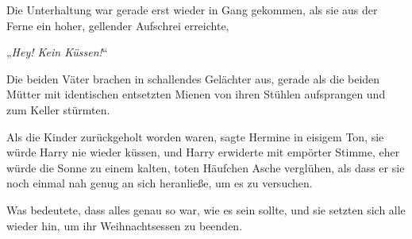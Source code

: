\later

Die Unterhaltung war gerade erst wieder in Gang gekommen, als sie aus der Ferne ein hoher, gellender Aufschrei erreichte,

„\emph{Hey! Kein Küssen!}“

Die beiden Väter brachen in schallendes Gelächter aus, gerade als die beiden Mütter mit identischen entsetzten Mienen von ihren Stühlen aufsprangen und zum Keller stürmten.

Als die Kinder zurückgeholt worden waren, sagte Hermine in eisigem Ton, sie würde Harry nie wieder küssen, und Harry erwiderte mit empörter Stimme, eher würde die Sonne zu einem kalten, toten Häufchen Asche verglühen, als dass er sie noch einmal nah genug an sich heranließe, um es zu versuchen.

Was bedeutete, dass alles genau so war, wie es sein sollte, und sie setzten sich alle wieder hin, um ihr Weihnachtsessen zu beenden.